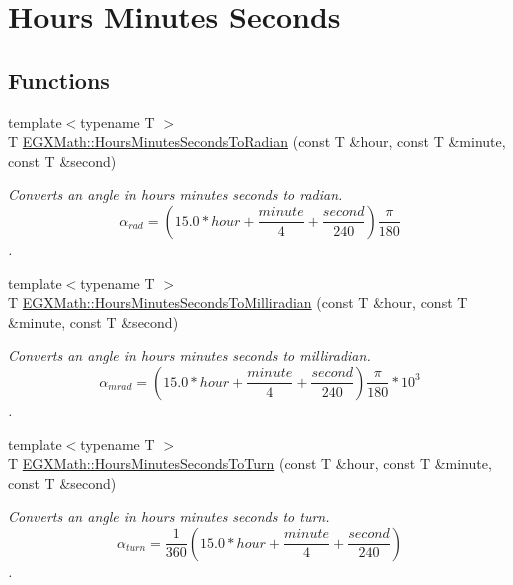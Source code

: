 \hypertarget{group___e_g_x_math-_angle_conversions-_hours_minutes_seconds}{}\section{Hours Minutes Seconds}
\label{group___e_g_x_math-_angle_conversions-_hours_minutes_seconds}
\subsection*{Functions}
\begin{DoxyCompactItemize}
\item 
{\footnotesize template$<$typename T $>$ }\\T \mbox{\hyperlink{group___e_g_x_math-_angle_conversions-_hours_minutes_seconds_gaa0b04e9012ec739df1464298971e3be7}{E\+G\+X\+Math\+::\+Hours\+Minutes\+Seconds\+To\+Radian}} (const T \&hour, const T \&minute, const T \&second)
\begin{DoxyCompactList}\small\item\em Converts an angle in hours minutes seconds to radian. \[\alpha_{rad}=(15.0 * hour + \frac{minute}{4} + \frac{second}{240})\frac{\pi}{180}\]. \end{DoxyCompactList}\item 
{\footnotesize template$<$typename T $>$ }\\T \mbox{\hyperlink{group___e_g_x_math-_angle_conversions-_hours_minutes_seconds_gad78a90abaed52ca9d5fe6b4287c4a5f3}{E\+G\+X\+Math\+::\+Hours\+Minutes\+Seconds\+To\+Milliradian}} (const T \&hour, const T \&minute, const T \&second)
\begin{DoxyCompactList}\small\item\em Converts an angle in hours minutes seconds to milliradian. \[\alpha_{mrad}=(15.0 * hour + \frac{minute}{4} + \frac{second}{240})\frac{\pi}{180}*10^3\]. \end{DoxyCompactList}\item 
{\footnotesize template$<$typename T $>$ }\\T \mbox{\hyperlink{group___e_g_x_math-_angle_conversions-_hours_minutes_seconds_ga68050282994968cd6f80a396f6a539ae}{E\+G\+X\+Math\+::\+Hours\+Minutes\+Seconds\+To\+Turn}} (const T \&hour, const T \&minute, const T \&second)
\begin{DoxyCompactList}\small\item\em Converts an angle in hours minutes seconds to turn. \[\alpha_{turn}=\frac{1}{360}(15.0 * hour + \frac{minute}{4} + \frac{second}{240})\]. \end{DoxyCompactList}\item 

\end{DoxyCompactItemize}
